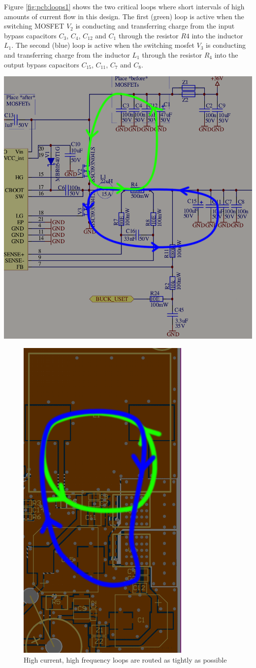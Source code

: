 \begin{minipage}{0.5\textwidth}
    Figure  \ref{fig:pcb:loops1}  shows the  two  critical  loops where  short
    intervals  of high  amounts  of  current flow  in  this design. The  first
    (green) loop is  active when the switching MOSFET $V_2$  is conducting and
    transferring  charge  from  the  input  bypass  capacitors  $C_3$,  $C_4$,
    $C_{12}$ and $C_1$ through the resistor $R4$ into the inductor $L_1$.  The
    second (blue) loop is active when the switching mosfet $V_3$ is conducting
    and transferring charge from the inductor $L_1$ through the resistor $R_4$
    into the output bypass capacitors $C_{15}$, $C_{11}$, $C_7$ and $C_8$.

\end{minipage}
\begin{minipage}{0.5\textwidth}
    \centering
    \includegraphics[width=\textwidth,trim=0 25mm 0 0,clip]{images/circuit/schematic_high_current.png}
    \label{fig:pcb:loops1}
\end{minipage}

\begin{figure}[h!]
    \center
    \includegraphics[width=.3\textwidth]{images/pcb/buck2.png}
    \caption{High current, high frequency loops are routed as tightly as possible}
    \label{fig:pcb:loops2}
\end{figure}

